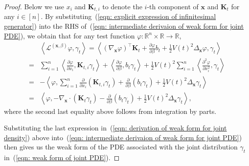\documentclass{article}
\numberwithin{equation}{section}
\def\eqref#1{(\ref{#1})}
\def\vx{{\bm{x}}}
\def\mK{{\bm{K}}}
\newcommand{\Ls}{\mathcal{L}}
\begin{document}
\begin{proof}
    Below we use $x_i$ and $\mK_{t,i}$ to denote the $i$-th component of $\vx$ and $\mK_t$ for any $i \in [n]$. By substituting~\eqref{eqn: explicit expression of infinitesimal generator} into the RHS of~\eqref{eqn: intermediate derivaion of weak form for joint PDE}, we obtain that for any test function $\varphi:\mathbb{R}^n \times \mathbb{R} \rightarrow \mathbb{R}$,
    \begin{equation}
    \label{eqn: derivation of weak form for joint density}
    \begin{aligned}
    &\left\langle\Ls^{(\vx,\beta)}\varphi, \gamma_t\right\rangle = \left\langle\left(\nabla_{\vx}\varphi\right)^\intercal\mK_t + \frac{\partial \varphi}{\partial \beta}b_t + \frac{1}{2}V(t)^2\Delta_{\vx}\varphi, \gamma_t\right\rangle\\
    =& \sum_{i=1}^{n}\left\langle\frac{\partial \varphi}{\partial x_i},\mK_{t,i} \gamma_{t} \right\rangle + \left\langle\frac{\partial \varphi}{\partial \beta},b_t\gamma_{t} \right\rangle + \frac{1}{2}V(t)^2\sum_{i=1}^{n}\left\langle\frac{\partial^2 \varphi}{\partial x_i^2}, \gamma_{t} \right\rangle\\
    =& -\left\langle\varphi, \sum_{i=1}^{n}\frac{\partial}{\partial x_i}\left(\mK_{t,i} \gamma_{t}\right) + \frac{\partial}{\partial \beta}\left(b_t \gamma_{t}\right) + \frac{1}{2}V(t)^2\Delta_{\vx}\gamma_{t} \right\rangle\\
    =& \left\langle\varphi, -\nabla_{\vx} \cdot \left(\mK_{t}\gamma_t\right) - \frac{\partial}{\partial \beta}\left(b_t \gamma_t\right)+\frac{1}{2}V(t)^2\Delta_{\vx}\gamma_t\right\rangle,
    \end{aligned}    
    \end{equation}
    where the second last equality above follows from integration by parts. 
    
    Substituting the last expression in~\eqref{eqn: derivation of weak form for joint density} above into~\eqref{eqn: intermediate derivaion of weak form for joint PDE} then gives us the weak form of the PDE associated with the joint distribution $\gamma_t$ in~\eqref{eqn: weak form of joint PDE}.
\end{proof}
\end{document}
